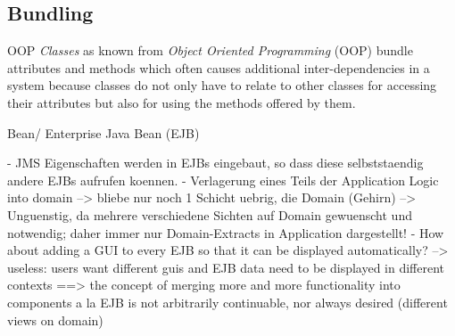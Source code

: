 %
%
%
%
%
%
%

\subsection{Bundling}
\label{bundling_heading}

OOP
\emph{Classes} as known from \emph{Object Oriented Programming} (OOP) bundle
attributes and methods which often causes additional inter-dependencies in a
system because classes do not only have to relate to other classes for accessing
their attributes but also for using the methods offered by them.

Bean/ Enterprise Java Bean (EJB)

- JMS Eigenschaften werden in EJBs eingebaut, so dass diese selbststaendig
andere EJBs aufrufen koennen.
- Verlagerung eines Teils der Application Logic into domain
--> bliebe nur noch 1 Schicht uebrig, die Domain (Gehirn)
--> Unguenstig, da mehrere verschiedene Sichten auf Domain gewuenscht und notwendig;
daher immer nur Domain-Extracts in Application dargestellt!
- How about adding a GUI to every EJB so that it can be displayed automatically?
--> useless: users want different guis and EJB data need to be displayed in
different contexts
==> the concept of merging more and more functionality into components a la EJB
is not arbitrarily continuable, nor always desired (different views on domain)
